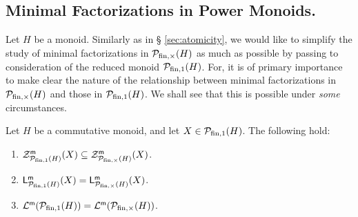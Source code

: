 \subsection{Minimal Factorizations in Power Monoids.}
\label{subsec:min-factorization-in-PMs}
%
Let $H$ be a monoid. Similarly as in \S{ }\ref{sec:atomicity}, we would like to simplify the study of minimal factorizations in $\mathcal{P}_{\textrm{fin}, \times}(H)$ as much as possible by passing to consideration of the reduced monoid $\mathcal{P}_{\textrm{fin}, 1}(H)$. For, it is of primary importance to make clear the nature of the relationship between minimal factorizations in $\mathcal{P}_{\textrm{fin}, \times}(H)$ and those in $\mathcal{P}_{\textrm{fin}, 1}(H)$.
We shall see that this is possible under \emph{some} circumstances. 
%
\begin{prop}\label{prop:comm-pm}
	Let $H$ be a commutative monoid, and let $X\in \mathcal{P}_{\textrm{fin},1}(H)$. The following hold:
	\begin{enumerate}[label = {\rm (\roman{*})}]
		\item\label{it:prop:comm-pm(i)} $\mathcal{Z}_{\mathcal{P}_{\textrm{fin},1}(H)}^{\mathsf{m}}(X) \subseteq \mathcal{Z}_{\mathcal{P}_{{\textrm{fin}, \times}}(H)}^{\mathsf{m}}(X)$.
		\item\label{it:prop:comm-pm(ii)} $\mathsf{L}_{\mathcal{P}_{\textrm{fin},1}(H)}^{\mathsf{m}}(X) = \mathsf{L}_{\mathcal{P}_{\textrm{fin}, \times}(H)}^{\mathsf{m}}(X)$.
		\item\label{it:prop:comm-pm(iii)} $\mathcal{L}^{\mathsf{m}}(\mathcal{P}_{\textrm{fin},1}(H)) = \mathcal{L}^{\mathsf{m}}(\mathcal{P}_{\textrm{fin}, \times}(H))$.
	\end{enumerate}
\end{prop}
%
